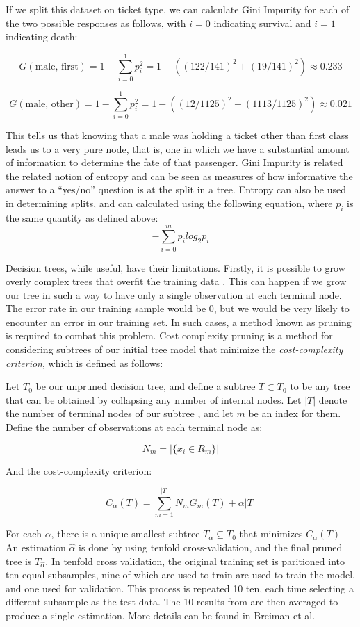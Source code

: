 \documentclass[preprint,12pt]{elsarticle}
\begin{document}
\noindent If we split this dataset on ticket type, we can calculate Gini Impurity for each of the two possible responses as follows, with $i=0$ indicating survival and $i=1$ indicating death:

$$G(\textrm{male, first}) = 1 - \sum\limits_{i=0}^1 p_{i}^{2} = 1 - ((122/141)^{2}+(19/141)^{2}) \approx 0.233 $$

$$G(\textrm{male, other}) = 1 - \sum\limits_{i=0}^1 p_{i}^{2} = 1 - ((12/1125)^{2}+(1113/1125)^{2}) \approx 0.021 $$

\noindent This tells us that knowing that a male was holding a ticket other than first class leads us to a very pure node, that is, one in which we have a substantial amount of information to determine the fate of that passenger. Gini Impurity is related the related notion of entropy and can be seen as measures of how informative the answer to a ``yes/no'' question is at the split in a tree. Entropy can also be used in determining splits, and can calculated using the following equation, where $p_{i}$ is the same quantity as defined above: 
$$-\sum\limits_{i=0}^m p_{i}log_{2}p_{i}$$

Decision trees, while useful, have their limitations. Firstly, it is possible to grow overly complex trees that overfit the training data \cite{ISLR}. This can happen if we grow our tree in such a way to have only a single observation at each terminal node. The error rate in our training sample would be $0$, but we would be very likely to encounter an error in our training set. In such cases, a method known as pruning is required to combat this problem. Cost complexity pruning is a method for considering subtrees of our initial tree model that minimize the \textit{cost-complexity criterion}, which is defined as follows\cite{ESL}:


Let $T_{0}$ be our unpruned decision tree, and define a subtree $T \subset T_{0}$ to be any tree that can be obtained by collapsing any number of internal nodes. Let $|T|$ denote the number of terminal nodes of our subtree , and let $m$ be an index for them. Define the number of observations at each terminal node as:

$$N_{m} = |\{x_{i} \in R_{m}\}| $$

\noindent And the cost-complexity criterion:

$$C_{\alpha}(T) = \sum\limits_{m=1}^{|T|} N_{m}G_{m}(T) + \alpha|T|$$

For each $\alpha$, there is a unique smallest subtree $T_{\alpha} \subseteq T_{0}$ that minimizes $C_{\alpha}(T)$ An estimation  $\hat{\alpha}$ is done by using tenfold cross-validation, and the final pruned tree is $T_{\hat{\alpha}}$. In tenfold cross validation, the original training set is paritioned into ten equal subsamples, nine of which are used to train are used to train the model, and one used for validation. This process is repeated 10 ten, each time selecting a different subsample as the test data. The 10 results from are then averaged to produce a single estimation. More details can be found in Breiman et al.\cite{Breiman1984}
\end{document}
